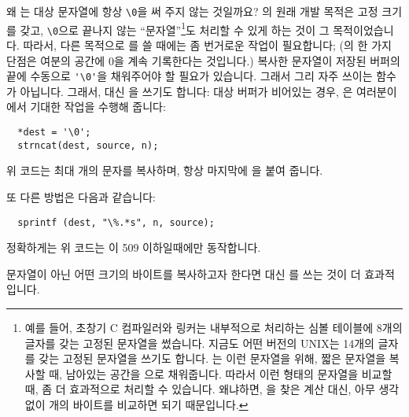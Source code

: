 \begin{faq}
	왜 는 대상 문자열에 항상 \verb+\0+을 써 주지
	않는 것일까요?
\A
	의 원래 개발 목적은 고정 크기를 갖고, \verb+\0+으로
	끝나지 않는 ``문자열''\footnote{예를 들어, 초창기 C 컴파일러와 링커는
          내부적으로 처리하는 심볼 테이블에 8개의 글자를 갖는 고정된 문자열을
          썼습니다. 지금도 어떤 버전의 UNIX는 14개의 글자를 갖는 고정된
          문자열을 쓰기도 합니다. 는 이런 문자열을 위해, 짧은
          문자열을 복사할 때, 남아있는 공간을 으로 채워줍니다.
          따라서 이런 형태의 문자열을 비교할 때, 좀 더 효과적으로 처리할 수
          있습니다. 왜냐하면, 을 찾은 계산 대신, 아무 생각 없이
          개의 바이트를 비교하면 되기 때문입니다.}도 처리할 수 
        있게 하는 것이 그 목적이었습니다.
        따라서, 다른 목적으로 를 쓸 때에는 좀 번거로운 작업이
        필요합니다; (의 한 가지 단점은 여분의 공간에 0을 계속
        기록한다는 것입니다.) 복사한 문자열이 저장된 버퍼의 끝에 
        수동으로 \verb+'\0'+을 채워주어야 할 필요가 있습니다. 그래서 그리 자주
        쓰이는 함수가 아닙니다. 
	그래서,  대신 을
	쓰기도 합니다: 대상 버퍼가 비어있는 경우,  은 여러분이
	에서 기대한 작업을 수행해 줍니다:
\begin{verbatim}
  *dest = '\0';
  strncat(dest, source, n);
\end{verbatim}
	\noindent 위 코드는 최대 개의 문자를 복사하며, 항상 마지막에
        을 붙여 줍니다.

	또 다른 방법은 다음과 같습니다:
\begin{verbatim}
  sprintf (dest, "\%.*s", n, source);
\end{verbatim}
	정확하게는 위 코드는 이 509 이하일때에만 동작합니다.

	문자열이 아닌 어떤 크기의 바이트를 복사하고자 한다면 
	대신 를 쓰는 것이 더 효과적입니다.
\end{faq}

